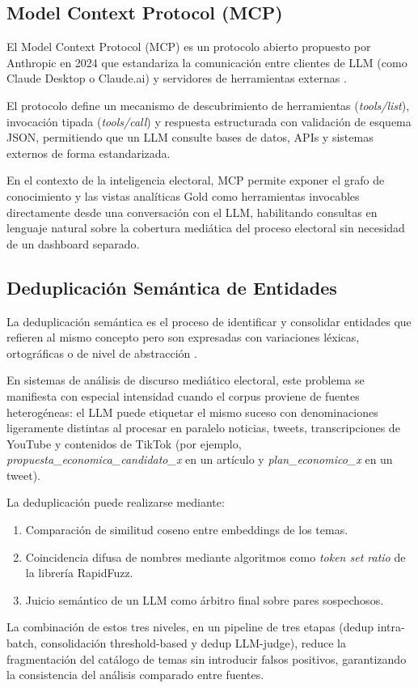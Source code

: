 \subsection{Model Context Protocol (MCP)}

El Model Context Protocol (MCP) es un protocolo abierto propuesto por Anthropic en 2024 que estandariza la comunicación entre clientes de LLM (como Claude Desktop o Claude.ai) y servidores de herramientas externas \parencite{tec_anthropic2024mcp}.

El protocolo define un mecanismo de descubrimiento de herramientas (\textit{tools/list}), invocación tipada (\textit{tools/call}) y respuesta estructurada con validación de esquema JSON, permitiendo que un LLM consulte bases de datos, APIs y sistemas externos de forma estandarizada.

En el contexto de la inteligencia electoral, MCP permite exponer el grafo de conocimiento y las vistas analíticas Gold como herramientas invocables directamente desde una conversación con el LLM, habilitando consultas en lenguaje natural sobre la cobertura mediática del proceso electoral sin necesidad de un dashboard separado.

\subsection{Deduplicación Semántica de Entidades}

La deduplicación semántica es el proceso de identificar y consolidar entidades que refieren al mismo concepto pero son expresadas con variaciones léxicas, ortográficas o de nivel de abstracción \parencite{tec_mudgal2018deepmatcher}.

En sistemas de análisis de discurso mediático electoral, este problema se manifiesta con especial intensidad cuando el corpus proviene de fuentes heterogéneas: el LLM puede etiquetar el mismo suceso con denominaciones ligeramente distintas al procesar en paralelo noticias, tweets, transcripciones de YouTube y contenidos de TikTok (por ejemplo, \textit{propuesta\_economica\_candidato\_x} en un artículo y \textit{plan\_economico\_x} en un tweet).

La deduplicación puede realizarse mediante:
\begin{enumerate}
    \item Comparación de similitud coseno entre embeddings de los temas.
    \item Coincidencia difusa de nombres mediante algoritmos como \textit{token set ratio} de la librería RapidFuzz.
    \item Juicio semántico de un LLM como árbitro final sobre pares sospechosos.
\end{enumerate}

La combinación de estos tres niveles, en un pipeline de tres etapas (dedup intra-batch, consolidación threshold-based y dedup LLM-judge), reduce la fragmentación del catálogo de temas sin introducir falsos positivos, garantizando la consistencia del análisis comparado entre fuentes.